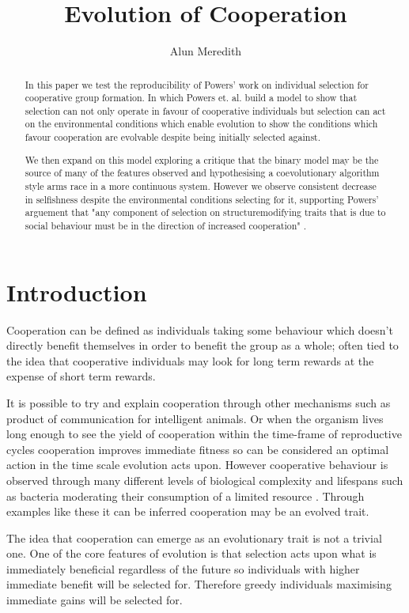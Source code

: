 \documentclass[a4paper,10pt, twocolumn]{article}
\begin{document}
\title{Evolution of Cooperation}
\author{Alun Meredith}
\maketitle

\begin{abstract}
In this paper we test the reproducibility of Powers' work \cite{Paper} on individual selection for cooperative group formation. In which Powers et. al. build a model to show that selection can not only operate in favour of cooperative individuals but selection can act on the environmental conditions which enable evolution to show the conditions which favour cooperation are evolvable despite being initially selected against. 

We then expand on this model exploring a critique that the binary model may be the source of many of the features observed and hypothesising a coevolutionary algorithm style arms race in a more continuous system. However we observe consistent decrease in selfishness despite the environmental conditions selecting for it, supporting Powers' arguement that "any component of selection on structuremodifying traits that is due to social behaviour must be in the direction of increased cooperation" \cite{Thesis}. 
\end{abstract}
\section{Introduction}
Cooperation can be defined as individuals taking some behaviour which doesn't directly benefit themselves in order to benefit the group as a whole; often tied to the idea that cooperative individuals may look for long term rewards at the expense of short term rewards. 

It is possible to try and explain cooperation through other mechanisms such as product of communication for intelligent animals. Or when the organism lives long enough to see the yield of cooperation within the time-frame of reproductive cycles cooperation improves immediate fitness so can be considered an optimal action in the time scale evolution acts upon. However cooperative behaviour is observed through many different levels of biological complexity and lifespans such as bacteria moderating their consumption of a limited resource \cite{Bacteria1,Bacteria2,Bacteria3,Bacteria4}. Through examples like these it can be inferred cooperation may be an evolved trait. 

The idea that cooperation can emerge as an evolutionary trait is not a trivial one. One of the core features of evolution is that selection acts upon what is immediately beneficial regardless of the future so individuals with higher immediate benefit will be selected for. Therefore greedy individuals maximising immediate gains will be selected for. 
\end{document}
